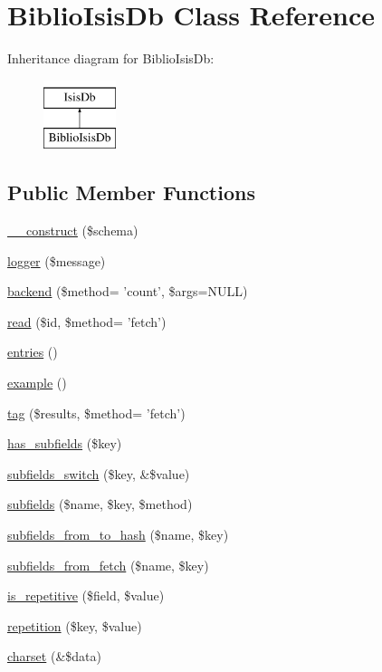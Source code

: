 \hypertarget{classBiblioIsisDb}{
\section{BiblioIsisDb Class Reference}
\label{classBiblioIsisDb}
}
Inheritance diagram for BiblioIsisDb:\begin{figure}[H]
\begin{center}
\leavevmode
\includegraphics[height=2.000000cm]{classBiblioIsisDb}
\end{center}
\end{figure}
\subsection*{Public Member Functions}
\begin{DoxyCompactItemize}
\item 
\hyperlink{classBiblioIsisDb_ab2c5ec782b324847e104d8ad35a230af}{\_\-\_\-construct} (\$schema)
\item 
\hyperlink{classBiblioIsisDb_a286fb16de5797785d28021068efca561}{logger} (\$message)
\item 
\hyperlink{classBiblioIsisDb_ad5704f5c9454ac053e66a489797ba221}{backend} (\$method= 'count', \$args=NULL)
\item 
\hyperlink{classBiblioIsisDb_a808cdbc0d4c8f62a1465e74064f4422f}{read} (\$id, \$method= 'fetch')
\item 
\hyperlink{classBiblioIsisDb_ab6b0a977c066c25c6bdca5c1d3a083e8}{entries} ()
\item 
\hyperlink{classBiblioIsisDb_a8e76b289b9e3a9893b9469094753d2bc}{example} ()
\item 
\hyperlink{classBiblioIsisDb_a34483b463d81ba1d8031576b5735efbc}{tag} (\$results, \$method= 'fetch')
\item 
\hyperlink{classBiblioIsisDb_a73d5d998f9ab7e410c5f71f65e83948b}{has\_\-subfields} (\$key)
\item 
\hyperlink{classBiblioIsisDb_af0be305b211b96dcb4aeb8452c8331a9}{subfields\_\-switch} (\$key, \&\$value)
\item 
\hyperlink{classBiblioIsisDb_a450e26ae0b7f4967d8e25c9a3d023c75}{subfields} (\$name, \$key, \$method)
\item 
\hyperlink{classBiblioIsisDb_a8c6a0081c5296a6db520e98998502ef7}{subfields\_\-from\_\-to\_\-hash} (\$name, \$key)
\item 
\hyperlink{classBiblioIsisDb_a2b08c6a7ba20f6f5eb07edb2b4a914c1}{subfields\_\-from\_\-fetch} (\$name, \$key)
\item 
\hyperlink{classBiblioIsisDb_aa86380f9e66ea8f175c50675d1fe0a88}{is\_\-repetitive} (\$field, \$value)
\item 
\hyperlink{classBiblioIsisDb_a04089d61ce04b18aa6a78c94ca02edb9}{repetition} (\$key, \$value)
\item 
\hyperlink{classBiblioIsisDb_a2b6fd7b7316f63ac5649ebf3947c4fae}{charset} (\&\$data)
\end{DoxyCompactItemize}
